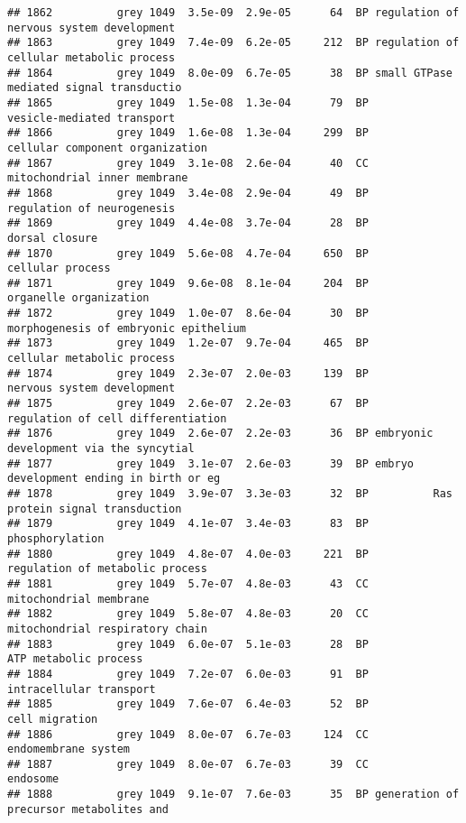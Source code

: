 \documentclass[]{article}
\begin{document}
\begin{verbatim}
## 1862          grey 1049  3.5e-09  2.9e-05      64  BP regulation of nervous system development
## 1863          grey 1049  7.4e-09  6.2e-05     212  BP regulation of cellular metabolic process
## 1864          grey 1049  8.0e-09  6.7e-05      38  BP small GTPase mediated signal transductio
## 1865          grey 1049  1.5e-08  1.3e-04      79  BP               vesicle-mediated transport
## 1866          grey 1049  1.6e-08  1.3e-04     299  BP          cellular component organization
## 1867          grey 1049  3.1e-08  2.6e-04      40  CC             mitochondrial inner membrane
## 1868          grey 1049  3.4e-08  2.9e-04      49  BP               regulation of neurogenesis
## 1869          grey 1049  4.4e-08  3.7e-04      28  BP                           dorsal closure
## 1870          grey 1049  5.6e-08  4.7e-04     650  BP                         cellular process
## 1871          grey 1049  9.6e-08  8.1e-04     204  BP                   organelle organization
## 1872          grey 1049  1.0e-07  8.6e-04      30  BP    morphogenesis of embryonic epithelium
## 1873          grey 1049  1.2e-07  9.7e-04     465  BP               cellular metabolic process
## 1874          grey 1049  2.3e-07  2.0e-03     139  BP               nervous system development
## 1875          grey 1049  2.6e-07  2.2e-03      67  BP       regulation of cell differentiation
## 1876          grey 1049  2.6e-07  2.2e-03      36  BP embryonic development via the syncytial 
## 1877          grey 1049  3.1e-07  2.6e-03      39  BP embryo development ending in birth or eg
## 1878          grey 1049  3.9e-07  3.3e-03      32  BP          Ras protein signal transduction
## 1879          grey 1049  4.1e-07  3.4e-03      83  BP                          phosphorylation
## 1880          grey 1049  4.8e-07  4.0e-03     221  BP          regulation of metabolic process
## 1881          grey 1049  5.7e-07  4.8e-03      43  CC                   mitochondrial membrane
## 1882          grey 1049  5.8e-07  4.8e-03      20  CC          mitochondrial respiratory chain
## 1883          grey 1049  6.0e-07  5.1e-03      28  BP                    ATP metabolic process
## 1884          grey 1049  7.2e-07  6.0e-03      91  BP                  intracellular transport
## 1885          grey 1049  7.6e-07  6.4e-03      52  BP                           cell migration
## 1886          grey 1049  8.0e-07  6.7e-03     124  CC                      endomembrane system
## 1887          grey 1049  8.0e-07  6.7e-03      39  CC                                 endosome
## 1888          grey 1049  9.1e-07  7.6e-03      35  BP generation of precursor metabolites and 

\end{verbatim}
\end{document}
